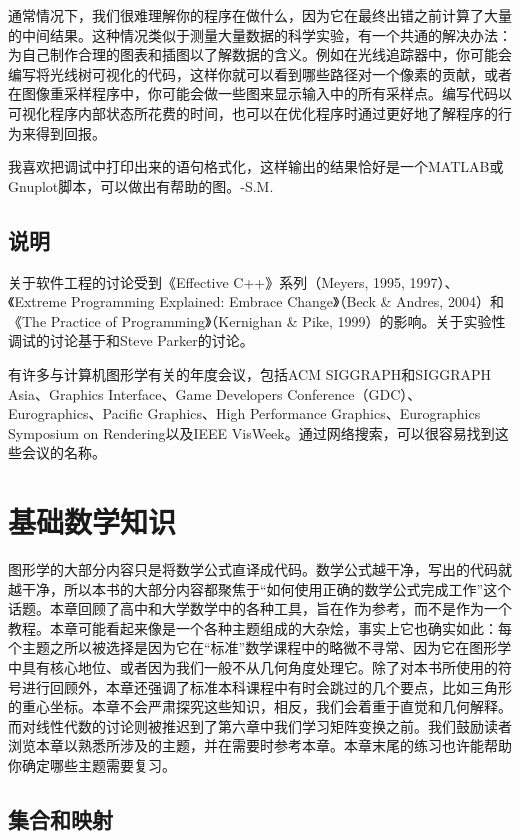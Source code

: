 \documentclass[lang=cn,12pt]{elegantbook}
\begin{document}
通常情况下，我们很难理解你的程序在做什么，因为它在最终出错之前计算了大量的中间结果。这种情况类似于测量大量数据的科学实验，有一个共通的解决办法：为自己制作合理的图表和插图以了解数据的含义。例如在光线追踪器中，你可能会编写将光线树可视化的代码，这样你就可以看到哪些路径对一个像素的贡献，或者在图像重采样程序中，你可能会做一些图来显示输入中的所有采样点。编写代码以可视化程序内部状态所花费的时间，也可以在优化程序时通过更好地了解程序的行为来得到回报。

\begin{note}
我喜欢把调试中打印出来的语句格式化，这样输出的结果恰好是一个MATLAB\textsuperscript{\textregistered}或Gnuplot脚本，可以做出有帮助的图。-S.M.
\end{note}

\section*{说明}
关于软件工程的讨论受到《Effective C++》系列（Meyers, 1995, 1997）、《Extreme Programming Explained: Embrace Change》（Beck \& Andres, 2004）和《The Practice of Programming》（Kernighan \& Pike, 1999）的影响。关于实验性调试的讨论基于和Steve Parker的讨论。

有许多与计算机图形学有关的年度会议，包括ACM SIGGRAPH和SIGGRAPH Asia、Graphics Interface、Game Developers Conference（GDC）、Eurographics、Pacific Graphics、High Performance Graphics、Eurographics Symposium on Rendering以及IEEE VisWeek。通过网络搜索，可以很容易找到这些会议的名称。

\chapter{基础数学知识}

图形学的大部分内容只是将数学公式直译成代码。数学公式越干净，写出的代码就越干净，所以本书的大部分内容都聚焦于“如何使用正确的数学公式完成工作”这个话题。本章回顾了高中和大学数学中的各种工具，旨在作为参考，而不是作为一个教程。本章可能看起来像是一个各种主题组成的大杂烩，事实上它也确实如此：每个主题之所以被选择是因为它在“标准”数学课程中的略微不寻常、因为它在图形学中具有核心地位、或者因为我们一般不从几何角度处理它。除了对本书所使用的符号进行回顾外，本章还强调了标准本科课程中有时会跳过的几个要点，比如三角形的重心坐标。本章不会严肃探究这些知识，相反，我们会着重于直觉和几何解释。而对线性代数的讨论则被推迟到了第六章中我们学习矩阵变换之前。我们鼓励读者浏览本章以熟悉所涉及的主题，并在需要时参考本章。本章末尾的练习也许能帮助你确定哪些主题需要复习。

\section{集合和映射}
\end{document}
